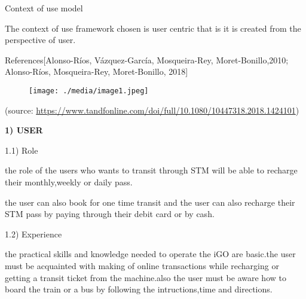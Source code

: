 \documentclass[12pt]{article}
\begin{document}
{\fontsize{20pt}{24.0pt}\selectfont Context of use model\par}\par


\vspace{\baselineskip}
The context of use framework chosen is user centric that is it is created from the perspective of user.\par

References[Alonso-Ríos, Vázquez-García, Mosqueira-Rey, Moret-Bonillo,2010; Alonso-Ríos, Mosqueira-Rey, Moret-Bonillo, 2018]\par


\vspace{\baselineskip}

\vspace{\baselineskip}



\begin{figure}[H]
	\begin{Center}
		\texttt{[image: ./media/image1.jpeg]}
	\end{Center}
\end{figure}



\par


\vspace{\baselineskip}
 (source: \href{https://www.tandfonline.com/doi/full/10.1080/10447318.2018.1424101}{https://www.tandfonline.com/doi/full/10.1080/10447318.2018.1424101})\par

\textbf{1) USER}\par

1.1) Role\par

the role of the users who wants to transit through STM will be able to recharge their monthly,weekly or daily pass.\par

the user can also book for one time transit and the user can also recharge their STM pass by paying through their debit card or by cash.\par

1.2) Experience\par

the practical skills and knowledge needed to operate the iGO are basic.the user must be acquainted with making of online transactions while recharging or getting a transit ticket from the machine.also the user must be aware how to board the train or a bus by following the intructions,time and directions.\par
\end{document}
